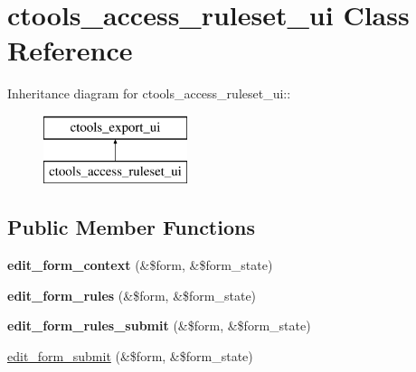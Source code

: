 \hypertarget{classctools__access__ruleset__ui}{
\section{ctools\_\-access\_\-ruleset\_\-ui Class Reference}
\label{classctools__access__ruleset__ui}
}
Inheritance diagram for ctools\_\-access\_\-ruleset\_\-ui::\begin{figure}[H]
\begin{center}
\leavevmode
\includegraphics[height=2cm]{classctools__access__ruleset__ui}
\end{center}
\end{figure}
\subsection*{Public Member Functions}
\begin{DoxyCompactItemize}
\item 
\hypertarget{classctools__access__ruleset__ui_ad8afed63ae160bf77d9346dbebdac192}{
{\bfseries edit\_\-form\_\-context} (\&\$form, \&\$form\_\-state)}
\label{classctools__access__ruleset__ui_ad8afed63ae160bf77d9346dbebdac192}

\item 
\hypertarget{classctools__access__ruleset__ui_a6f091ff5645ea903c5392b552de74bdf}{
{\bfseries edit\_\-form\_\-rules} (\&\$form, \&\$form\_\-state)}
\label{classctools__access__ruleset__ui_a6f091ff5645ea903c5392b552de74bdf}

\item 
\hypertarget{classctools__access__ruleset__ui_aa2777ee92999ae8bacb03b1cf5150688}{
{\bfseries edit\_\-form\_\-rules\_\-submit} (\&\$form, \&\$form\_\-state)}
\label{classctools__access__ruleset__ui_aa2777ee92999ae8bacb03b1cf5150688}

\item 
\hyperlink{classctools__access__ruleset__ui_a662643e9e29c9692d71783bc446ec1ee}{edit\_\-form\_\-submit} (\&\$form, \&\$form\_\-state)
\end{DoxyCompactItemize}


